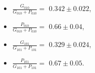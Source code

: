 \begin{itemize}
  \item $\frac{G_{010}}{G_{010} + P_{010}} =$ $0.342 \pm 0.022$,
  \item $\frac{P_{010}}{G_{010} + P_{010}} =$ $0.66 \pm 0.04$,
  \item $\frac{G_{101}}{G_{101} + P_{101}} =$ $0.329 \pm 0.024$,
  \item $\frac{P_{101}}{G_{101} + P_{101}} =$ $0.67 \pm 0.05$.
\end{itemize}
